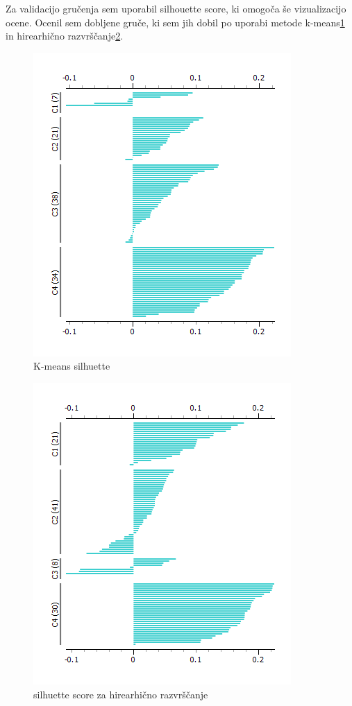 \documentclass[a4paper,11pt]{article}
\begin{document}
Za validacijo gručenja sem uporabil silhouette score, ki omogoča še vizualizacijo ocene. Ocenil sem dobljene gruče, ki sem jih dobil po uporabi metode k-means\ref{slika5} in hirearhično razvrščanje\ref{slika6}.



\begin{figure}[htbp]
\begin{center}
\includegraphics[scale=0.7]{k-means-silhuette.png}
\caption{K-means silhuette}
\label{slika5}
\end{center}
\end{figure}

\begin{figure}[htbp]
\begin{center}
\includegraphics[scale=0.7]{hirearhicno-silhuette.png}
\caption{silhuette score za hirearhično razvrščanje}
\label{slika6}
\end{center}
\end{figure}
\end{document}
